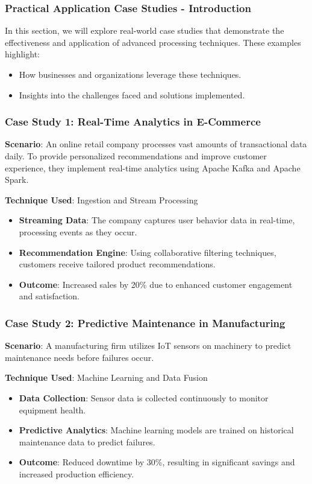 \documentclass[aspectratio=169]{beamer}
\begin{document}
\begin{frame}[fragile]
    \frametitle{Practical Application Case Studies - Introduction}
    In this section, we will explore real-world case studies that demonstrate the effectiveness and application of advanced processing techniques. These examples highlight:
    \begin{itemize}
        \item How businesses and organizations leverage these techniques.
        \item Insights into the challenges faced and solutions implemented.
    \end{itemize}
\end{frame}

\begin{frame}[fragile]
    \frametitle{Case Study 1: Real-Time Analytics in E-Commerce}
    \textbf{Scenario}: An online retail company processes vast amounts of transactional data daily. To provide personalized recommendations and improve customer experience, they implement real-time analytics using Apache Kafka and Apache Spark.
    
    \textbf{Technique Used}: Ingestion and Stream Processing
    
    \begin{itemize}
        \item \textbf{Streaming Data}: The company captures user behavior data in real-time, processing events as they occur.
        \item \textbf{Recommendation Engine}: Using collaborative filtering techniques, customers receive tailored product recommendations.
        \item \textbf{Outcome}: Increased sales by 20\% due to enhanced customer engagement and satisfaction.
    \end{itemize}
\end{frame}

\begin{frame}[fragile]
    \frametitle{Case Study 2: Predictive Maintenance in Manufacturing}
    \textbf{Scenario}: A manufacturing firm utilizes IoT sensors on machinery to predict maintenance needs before failures occur.
    
    \textbf{Technique Used}: Machine Learning and Data Fusion
    
    \begin{itemize}
        \item \textbf{Data Collection}: Sensor data is collected continuously to monitor equipment health.
        \item \textbf{Predictive Analytics}: Machine learning models are trained on historical maintenance data to predict failures.
        \item \textbf{Outcome}: Reduced downtime by 30\%, resulting in significant savings and increased production efficiency.
    \end{itemize}
\end{frame}
\end{document}
